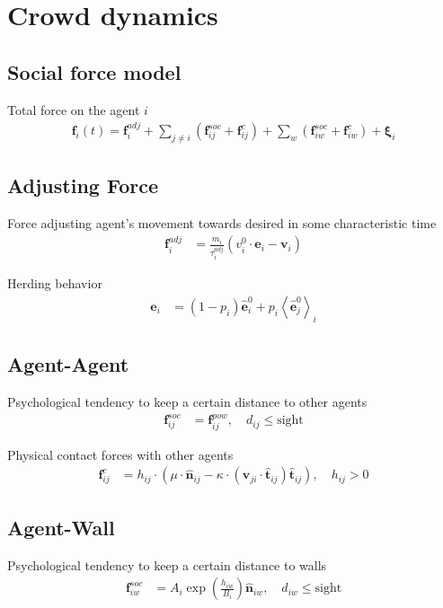 \section{Crowd dynamics}
\subsection{Social force model}
Total force on the agent $ i $
\begin{align}
\mathbf{f}_{i}(t) = \mathbf{f}_{i}^{adj} + \sum_{j\neq i}^{} \left(\mathbf{f}_{ij}^{soc} + \mathbf{f}_{ij}^{c}\right) + \sum_{w}^{} \left(\mathbf{f}_{iw}^{soc} + \mathbf{f}_{iw}^{c}\right) + \boldsymbol{\xi}_{i}
\end{align}


\subsection{Adjusting Force}
Force adjusting agent's movement towards desired in some characteristic time \begin{align}
\mathbf{f}_{i}^{adj} &= \frac{m_{i}}{\tau_{i}^{adj}} (v_{i}^{0} \cdot \hat{\mathbf{e}}_{i} - \mathbf{v}_{i}) 
\end{align}

Herding behavior
\begin{align}
\mathbf{e}_{i} &= (1 - p_{i}) \hat{\mathbf{e}}_{i}^{0} + p_{i} \left\langle \hat{\mathbf{e}}_{j}^{0} \right\rangle_{i}
\end{align}


\subsection{Agent-Agent}
Psychological tendency to keep a certain distance to other agents
\begin{align}
\mathbf{f}_{ij}^{soc} &= \mathbf{f}_{ij}^{pow}, \quad  d_{ij} \leq \text{sight} 
\end{align}

Physical contact forces with other agents 
\begin{align}
\mathbf{f}_{ij}^{c} &= h_{ij} \cdot \left(\mu \cdot \hat{\mathbf{n}}_{ij} - \kappa \cdot \left(\mathbf{v}_{ji} \cdot \hat{\mathbf{t}}_{ij}\right) \hat{\mathbf{t}}_{ij}\right), \quad h_{ij} > 0
\end{align}


\subsection{Agent-Wall}
Psychological tendency to keep a certain distance to walls
\begin{align}
\mathbf{f}_{iw}^{soc} &= A_{i} \exp\left(\frac{h_{iw}}{B_{i}}\right) \hat{\mathbf{n}}_{iw}, \quad  d_{iw} \leq \text{sight}
\end{align} 

